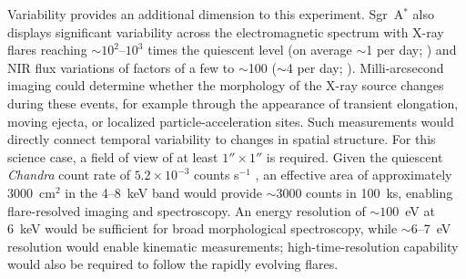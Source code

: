 \documentclass{article}
\begin{document}
Variability provides an additional dimension to this experiment. Sgr~A$^*$ also displays significant variability across the electromagnetic spectrum with X-ray flares reaching $\sim10^2$--$10^3$ times the quiescent level (on average $\sim$1 per day; \cite{Neilsen2013}) and NIR flux variations of factors of a few to $\sim$100 ($\sim$4 per day; \cite{Schodel2011,Do2019}). Milli-arcsecond imaging could determine whether the morphology of the X-ray source changes during these events, for example through the appearance of transient elongation, moving ejecta, or localized particle-acceleration sites. Such measurements would directly connect temporal variability to changes in spatial structure. For this science case, a field of view of at least $1''\times1''$ is required. Given the quiescent \textit{Chandra} count rate of $5.2\times10^{-3}$ counts s$^{-1}$ \cite{Neilsen2013}, an effective area of approximately $3000$~cm$^2$ in the 4--8~keV band would provide $\sim3000$ counts in 100~ks, enabling flare-resolved imaging and spectroscopy. An energy resolution of $\sim100$~eV at 6~keV would be sufficient for broad morphological spectroscopy, while $\sim6$--7~eV resolution would enable kinematic measurements; high-time-resolution capability would also be required to follow the rapidly evolving flares.
\end{document}
